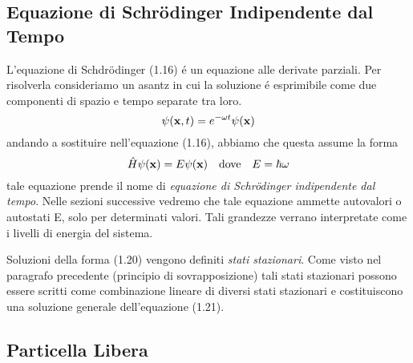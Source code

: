 \newpage 

\subsection{Equazione di Schr\"odinger Indipendente dal Tempo}

L'equazione di Schdr\"odinger (1.16) \'e un equazione alle derivate parziali. Per risolverla consideriamo un asantz in cui la soluzione \'e esprimibile come due componenti di spazio e tempo separate tra loro.
\begin{equation}
	\psi(\bold{x},t) = e^{-\omega t}\psi(\bold{x})
\end{equation}
andando a sostituire nell'equazione (1.16), abbiamo che questa assume la forma 
\begin{equation}
	\hat{H}\psi(\bold{x}) = E\psi(\bold{x}) \quad \text{dove} \quad E = \hbar\omega  
\end{equation}
tale equazione prende il nome di \textit{equazione di Schr\"odinger indipendente dal tempo}. Nelle sezioni successive vedremo che tale equazione ammette autovalori o autostati E, solo per determinati valori. Tali grandezze verrano interpretate come i livelli di energia del sistema.

\noindent Soluzioni della forma (1.20) vengono definiti \textit{stati stazionari}. Come visto nel paragrafo precedente (principio di sovrapposizione) tali stati stazionari possono essere scritti come combinazione lineare di diversi stati stazionari e costituiscono una soluzione generale dell'equazione (1.21).

\subsection{Particella Libera}

